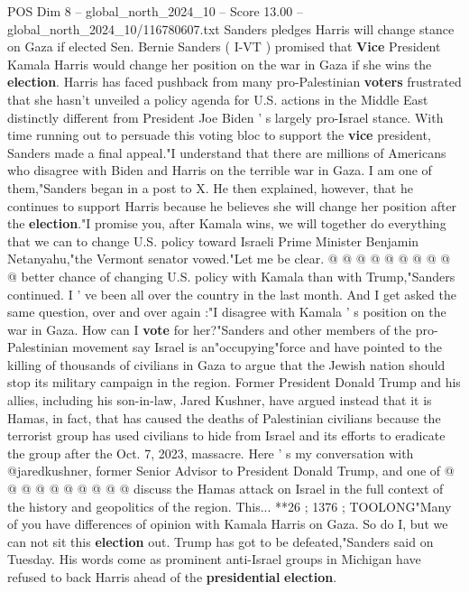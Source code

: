 \begin{textsample}{POS Dim 8 – global\_north\_2024\_10 – Score 13.00 – global\_north\_2024\_10/116780607.txt}  \label{ex:f8_pos_161}
Sanders pledges Harris will change stance on Gaza if elected Sen.
Bernie Sanders ( I-VT ) promised that \textbf{Vice} President Kamala Harris would change her position on the war in Gaza if she wins the \textbf{election}.
Harris has faced pushback from many pro-Palestinian \textbf{voters} frustrated that she hasn't unveiled a policy agenda for U.S. actions in the Middle East distinctly different from President Joe Biden ' s largely pro-Israel stance.
With time running out to persuade this voting bloc to support the \textbf{vice} president, Sanders made a final appeal."I understand that there are millions of Americans who disagree with Biden and Harris on the terrible war in Gaza.
I am one of them,"Sanders began in a post to X.
He then explained, however, that he continues to support Harris because he believes she will change her position after the \textbf{election}."I promise you, after Kamala wins, we will together do everything that we can to change U.S. policy toward Israeli Prime Minister Benjamin Netanyahu,"the Vermont senator vowed."Let me be clear. @ @ @ @ @ @ @ @ @ @ better chance of changing U.S. policy with Kamala than with Trump,"Sanders continued.
I ' ve been all over the country in the last month.
And I get asked the same question, over and over again :"I disagree with Kamala ' s position on the war in Gaza.
How can I \textbf{vote} for her?"Sanders and other members of the pro-Palestinian movement say Israel is an"occupying"force and have pointed to the killing of thousands of civilians in Gaza to argue that the Jewish nation should stop its military campaign in the region.
Former President Donald Trump and his allies, including his son-in-law, Jared Kushner, have argued instead that it is Hamas, in fact, that has caused the deaths of Palestinian civilians because the terrorist group has used civilians to hide from Israel and its efforts to eradicate the group after the Oct. 7, 2023, massacre.
Here ' s my conversation with @jaredkushner, former Senior Advisor to President Donald Trump, and one of @ @ @ @ @ @ @ @ @ @ discuss the Hamas attack on Israel in the full context of the history and geopolitics of the region.
This... **26 ; 1376 ; TOOLONG"Many of you have differences of opinion with Kamala Harris on Gaza.
So do I, but we can not sit this \textbf{election} out.
Trump has got to be defeated,"Sanders said on Tuesday.
His words come as prominent anti-Israel groups in Michigan have refused to back Harris ahead of the \textbf{presidential} \textbf{election}.

\end{textsample}
